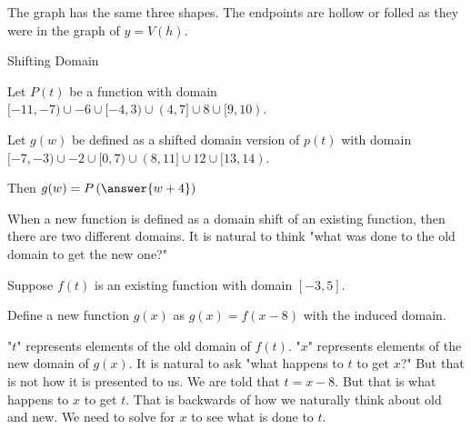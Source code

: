 \documentclass{ximera}
\begin{document}
\begin{example}
\begin{image}
\end{image}




The graph has the same three shapes. The endpoints are hollow or folled as they were in the graph of $y=V(h)$.



\end{example}






\begin{example} Shifting Domain


Let $P(t)$ be a function with domain $[-11, -7) \cup {-6} \cup [-4,3) \cup (4, 7] \cup {8} \cup [9, 10)$.

Let $g(w)$ be defined as a shifted domain version of $p(t)$ with domain $[-7, -3) \cup {-2} \cup [0,7) \cup (8, 11] \cup {12} \cup [13, 14)$.

Then  $g(w) = P\left(\answer{w+4}\right)$



\end{example}





When a new function is defined as a domain shift of an existing function, then there are two different domains.  It is natural to think "what was done to the old domain to get the new one?"

Suppose $f(t)$ is an existing function with domain $[-3, 5]$.

Define a new function $g(x)$ as $g(x) = f(x-8)$ with the induced domain.

"$t$" represents elements of the old domain of $f(t)$.  "$x$" represents elements of the new domain of $g(x)$.  It is natural to ask "what happens to $t$ to get $x$?"  But that is not how it is presented to us.  We are told that $t=x-8$.  But that is what happens to $x$ to get $t$.  That is backwards of how we naturally think about old and new.  We need to solve for $x$ to see what is done to $t$.
\end{document}
